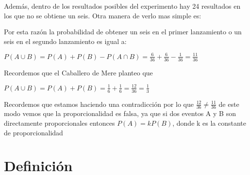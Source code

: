 \documentclass[12pt]{article}
\begin{document}
Además, dentro de los resultados posibles del experimento hay 24 resultados en los que no se obtiene un seis. Otra manera de verlo mas simple es: 


Por esta razón la probabilidad de obtener un seis en el primer lanzamiento o un seis en el segundo lanzamiento es igual a: 

$P(A \cup B)=P(A)+P(B)-P(A \cap B) = \frac{6}{36} + \frac{6}{36} - \frac{1}{36} = \frac{11}{36}$

Recordemos que el Caballero de Mere planteo que  

$P(A \cup B)=P(A)+P(B) = \frac{1}{6} + \frac{1}{6} = \frac{12}{36} = \frac{1}{3}$

Recordemos que estamos haciendo una contradicción por lo que $\frac{12}{36} \neq  \frac{11}{36}$ de este modo vemos que la proporcionalidad es falsa, ya que si dos eventos A y B son directamente proporcionales entonces $P(A) = kP(B)$, donde k es la constante de proporcionalidad 









\section{Definición }
\end{document}
